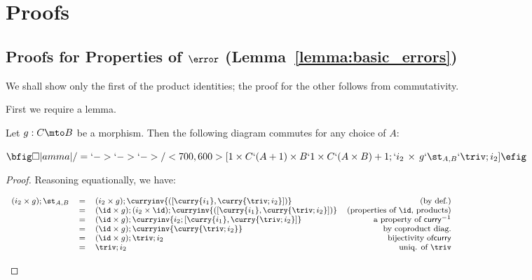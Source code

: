 \section{Proofs}
\label{sec:proofs}

\subsection{Proofs for Properties of $\error$ (Lemma~\ref{lemma:basic_errors})}
\label{subsec:proof_of_basic_errors}
We shall show only the first of the product identities; the proof for the other
follows from commutativity.

First we require a lemma.

\begin{lemma}
  Let $g : C \mto B$ be a morphism. Then the following diagram commutes for any choice of $A$:
  \begin{center}
    \begin{math}
      \bfig
      \square|amma|/=`->`->`->/<700,600>[1 \times C`(A + 1) \times B`1 \times C`(A \times B) + 1;`i_2 \, \times \, g`\st_{A,B}`\triv;i_2]%
      \efig
    \end{math}
  \end{center}
\end{lemma}
\begin{proof}
  Reasoning equationally, we have:
  \begin{center}
    \begin{math} \footnotesize
    \begin{array}{rllr}
      (i_2 \times g) ; \st_{A,B} & = & (i_2 \times g) ; \curryinv{([\curry{i_1}, \curry{\triv;i_2}])} & \text{(by def.)} \\
      & = & (\id \times g) ; (i_2 \times \id) ; \curryinv{([\curry{i_1}, \curry{\triv;i_2}])} & \text{(properties of } \id \text{, products)} \\
      & = & (\id \times g) ; \curryinv{i_2 ; [\curry{i_1}, \curry{\triv;i_2}]} & \text{a property of } \mathsf{curry}^{-1} \\
      & = & (\id \times g) ; \curryinv{\curry{\triv; i_2}} & \text{by coproduct diag.} \\
      & = & (\id \times g) ; \triv ; i_2 & \text{bijectivity of} \mathsf{curry} \\
      & = & \triv ; i_2 & \text{uniq. of } \triv \\
    \end{array}
    \end{math}
  \end{center}
\end{proof}

